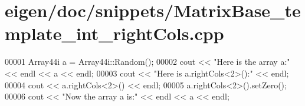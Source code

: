 \hypertarget{eigen_2doc_2snippets_2_matrix_base__template__int__right_cols_8cpp_source}{}\section{eigen/doc/snippets/\+Matrix\+Base\+\_\+template\+\_\+int\+\_\+right\+Cols.cpp}
\label{eigen_2doc_2snippets_2_matrix_base__template__int__right_cols_8cpp_source}

\begin{DoxyCode}
00001 Array44i a = Array44i::Random();
00002 cout << \textcolor{stringliteral}{"Here is the array a:"} << endl << a << endl;
00003 cout << \textcolor{stringliteral}{"Here is a.rightCols<2>():"} << endl;
00004 cout << a.rightCols<2>() << endl;
00005 a.rightCols<2>().setZero();
00006 cout << \textcolor{stringliteral}{"Now the array a is:"} << endl << a << endl;
\end{DoxyCode}
